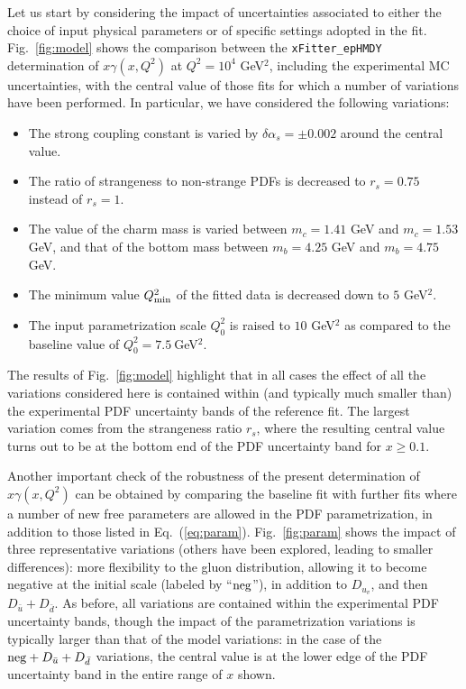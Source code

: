 Let us start by considering the impact of uncertainties associated to either
the choice of input physical parameters or of specific settings
adopted in the fit.
%
Fig.~\ref{fig:model} shows the comparison between the
{\tt xFitter\_epHMDY} 
determination of $x\gamma(x,Q^2)$ at $Q^2=10^4$ GeV$^2$, including the experimental MC
uncertainties, with the central
value of those fits for which a number of variations have been
performed.
%
In particular, we have considered the following variations:
\begin{itemize}
\item The strong coupling constant is varied by $\delta \alpha_s=\pm 0.002$ around the central value.
\item The ratio of strangeness to non-strange PDFs is decreased to $r_s=0.75$ instead of $r_s=1$.
\item The value of the charm mass is varied between $m_c=1.41$ GeV and $m_c=1.53$ GeV,
  and that of the bottom mass between $m_b=4.25$ GeV and $m_b=4.75$ GeV.
\item The minimum value $Q_{\rm min}^2$ of the fitted data is decreased down to $5$ GeV$^2$.
\item The input parametrization scale $Q_0^2$ is raised to $10$ GeV$^2$ as compared
  to the baseline value of $Q_0^2=7.5~$GeV$^2$.
\end{itemize}
The results of Fig.~\ref{fig:model} highlight that in all cases the effect
of all the variations considered here is contained within (and typically much smaller than) 
the experimental PDF uncertainty bands of the reference fit.
%
The largest variation comes from the strangeness ratio $r_s$, where the resulting
central value turns out to be at the bottom end of the PDF uncertainty band for $x\ge 0.1$.

Another important check of the robustness of the present determination of
$x\gamma(x, Q^2)$ can be obtained by comparing the baseline fit with further
fits where a number of new free parameters are allowed in the PDF
parametrization, in addition to those listed in Eq.~(\ref{eq:param}).
%
Fig.~\ref{fig:param} shows the impact of three representative
variations (others have been explored, leading to smaller
differences): more flexibility to the gluon distribution, allowing it
to become negative at the initial scale (labeled by ``${\rm neg}$''), in addition to $D_{u_v}$,
and then $D_{\bar{u}}+D_{\bar{d}}$.
%
As before, all variations are contained within the experimental PDF uncertainty
bands, though the impact of the parametrization variations is typically larger
than that of the model variations: in the case of the
${\rm neg}+D_{\bar{u}}+D_{\bar{d}}$ variations, the central value is
at the lower edge of the PDF uncertainty band in the entire range
of $x$ shown.
%

